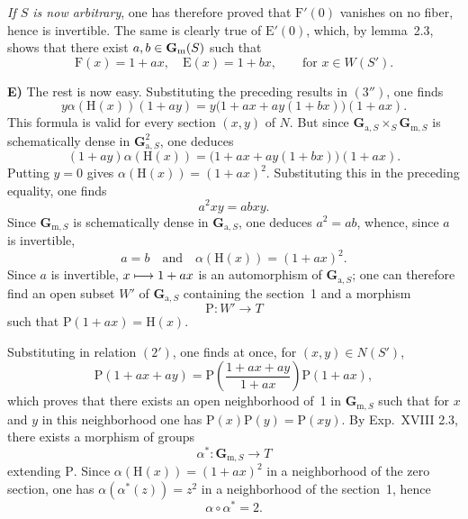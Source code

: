\emph{If $S$ is now arbitrary}, one has therefore proved that $\mathrm F'(0)$ vanishes on no fiber, hence is invertible. The same is clearly true of $\mathrm E'(0)$, which, by lemma~2.3, shows that there exist $a,b\in\mathbf{G}_{\mathrm{m}}(S)$ such that
\begin{equation}\tag{$\diamondsuit_1$}\label{XX.eq.diamond1}
\mathrm F(x)=1+ax,\quad\mathrm E(x)=1+bx,\qquad\text{for }x\in W(S').
\end{equation}

\textbf{E)} The rest is now easy. Substituting the preceding results in $(3'')$, one finds
\[
y\alpha(\mathrm H(x))(1+ay)=y\bigl(1+ax+ay(1+bx)\bigr)(1+ax).
\]
This formula is valid for every section $(x,y)$ of $N$. But since $\mathbf G_{\mathrm a,S}\times_S\mathbf G_{\mathrm m,S}$ is schematically dense in $\mathbf G_{\mathrm a,S}^2$, one deduces
\[
(1+ay)\alpha(\mathrm H(x))=\bigl(1+ax+ay(1+bx)\bigr)(1+ax).
\]
Putting $y=0$ gives $\alpha(\mathrm H(x))=(1+ax)^2$. Substituting this in the preceding equality, one finds{\renewcommand{\thefootnote}{(20)}}
\[
a^2xy=abxy.
\]
Since $\mathbf G_{\mathrm m,S}$ is schematically dense in $\mathbf G_{\mathrm a,S}$, one deduces $a^2=ab$, whence, since $a$ is invertible,
\begin{equation}\tag{$\diamondsuit_2$}\label{XX.eq.diamond2}
a=b\quad\text{and}\quad\alpha(\mathrm H(x))=(1+ax)^2.
\end{equation}
Since $a$ is invertible, $x\longmapsto1+ax$ is an automorphism of $\mathbf G_{\mathrm a,S}$; one can therefore find an open subset $W'$ of $\mathbf G_{\mathrm a,S}$ containing the section~1 and a morphism
\[
\mathrm P:W'\to T
\]
such that $\mathrm P(1+ax)=\mathrm H(x)$.{\renewcommand{\thefootnote}{(21)}}

Substituting in relation $(2')$, one finds at once, for $(x,y)\in N(S')$,
\[
\mathrm P(1+ax+ay)=\mathrm P\left(\frac{1+ax+ay}{1+ax}\right)\mathrm P(1+ax),
\]
which proves that there exists an open neighborhood of~1 in $\mathbf G_{\mathrm m,S}$ such that for $x$ and $y$ in this neighborhood one has $\mathrm P(x)\mathrm P(y)=\mathrm P(xy)$. By Exp.~XVIII 2.3, there exists a morphism of groups
\begin{equation}\tag{$\diamondsuit_3$}\label{XX.eq.diamond3}
\alpha^*:\mathbf G_{\mathrm m,S}\to T
\end{equation}
extending $\mathrm P$. Since $\alpha(\mathrm H(x))=(1+ax)^2$ in a neighborhood of the zero section, one has $\alpha(\alpha^*(z))=z^2$ in a neighborhood of the section~1, hence
\begin{equation}\tag{$\diamondsuit_4$}\label{XX.eq.diamond4}
\alpha\circ\alpha^*=2.
\end{equation}
